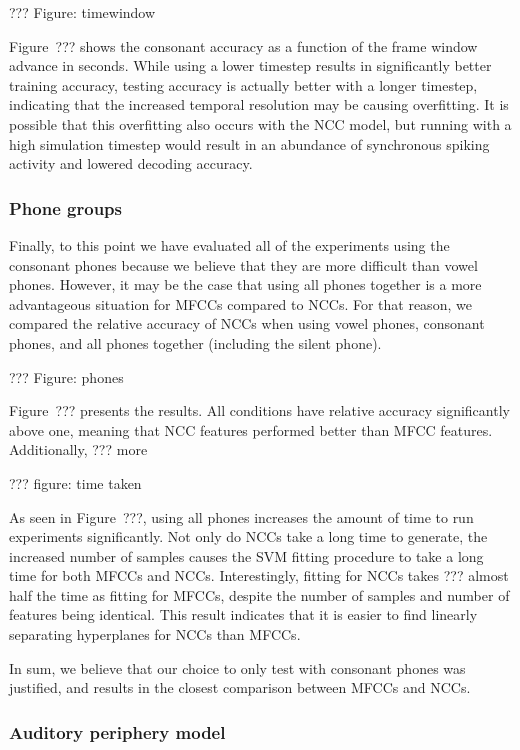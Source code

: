 ??? Figure: timewindow

Figure~??? shows the consonant accuracy
as a function of the
frame window advance in seconds.
While using a lower timestep results in
significantly better training accuracy,
testing accuracy is actually better
with a longer timestep,
indicating that the increased temporal
resolution may be causing overfitting.
It is possible that this overfitting
also occurs with the NCC model,
but running with a high simulation timestep
would result in an abundance of
synchronous spiking activity
and lowered decoding accuracy.

\subsubsection{Phone groups}

Finally, to this point we have
evaluated all of the experiments using
the consonant phones
because we believe that they are
more difficult than vowel phones.
However, it may be the case that
using all phones together
is a more advantageous situation
for MFCCs compared to NCCs.
For that reason,
we compared the relative accuracy
of NCCs when using
vowel phones, consonant phones,
and all phones together
(including the silent phone).

??? Figure: phones

Figure~??? presents the results.
All conditions have relative accuracy
significantly above one,
meaning that NCC features performed
better than MFCC features.
Additionally, ??? more

??? figure: time taken

As seen in Figure~???,
using all phones increases the
amount of time to run experiments significantly.
Not only do NCCs take a long time to generate,
the increased number of samples
causes the SVM fitting procedure
to take a long time
for both MFCCs and NCCs.
Interestingly, fitting for NCCs
takes ??? almost half
the time as fitting for MFCCs,
despite the number of samples
and number of features being identical.
This result indicates that it is
easier to find linearly separating hyperplanes
for NCCs than MFCCs.

In sum, we believe that our choice to
only test with consonant phones
was justified,
and results in the closest
comparison between MFCCs and NCCs.

\subsubsection{Auditory periphery model}
\label{sec:results-periphmodel}

